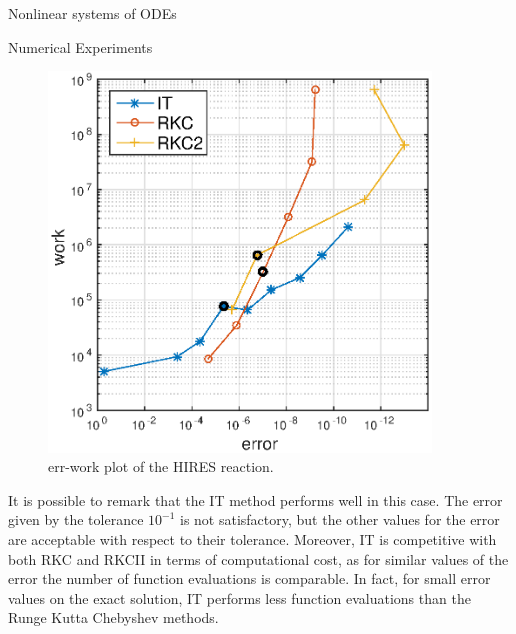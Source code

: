 \documentclass{article}
\begin{document}
\begin{section}{Nonlinear systems of ODEs}
\begin{subsection}{Numerical Experiments}
\begin{figure}[t!]
\includegraphics [width=4in]{Pictures/HIRES.eps}
\caption{err-work plot of the HIRES reaction.}
\label{fig:HIRES}
\end{figure}
It is possible to remark that the IT method performs well in this case. The error given by the tolerance $10^{-1}$ is not satisfactory, but the other values for the error are acceptable with respect to their tolerance. Moreover, IT is competitive with both RKC and RKCII in terms of computational cost, as for similar values of the error the number of function evaluations is comparable. In fact, for small error values on the exact solution, IT performs less function evaluations than the Runge Kutta Chebyshev methods.\\


\end{subsection}
\end{section}
\end{document}

